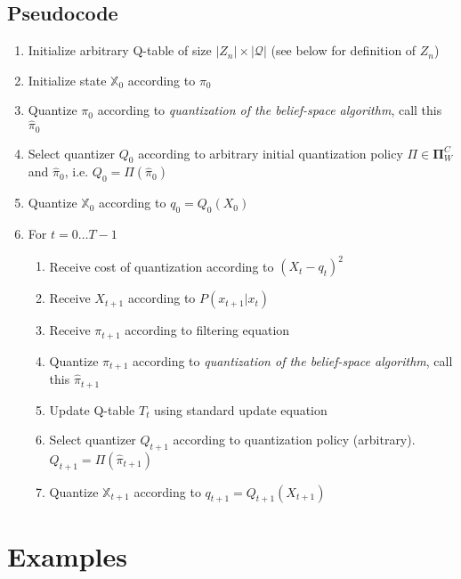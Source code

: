\documentclass{article}
\begin{document}
\subsection{Pseudocode}
\begin{enumerate}
    \item Initialize arbitrary Q-table of size \( |Z_n| \times |\mathcal{Q}| \) (see below for definition of \( Z_n \))
    \item Initialize state \( \mathbb{X}_0 \) according to \( \pi_0 \)
    \item Quantize \( \pi_0 \) according to \emph{quantization of the belief-space algorithm}, call this \( \hat{\pi}_0 \)
    \item Select quantizer \( Q_0 \) according to arbitrary initial quantization policy \( \Pi \in \mathbf{\Pi}^C_W \) and \( \hat{\pi}_0 \), i.e. \( Q_0 = \Pi(\hat{\pi}_0) \)
    \item Quantize \( \mathbb{X}_0 \) according to \( q_0 = Q_0(X_0) \)
    \item For \( t = 0 \ldots T-1 \)
          \begin{enumerate}
              \item Receive cost of quantization according to \( {(X_t - q_t)}^2 \)
              \item Receive \( X_{t+1} \) according to \( P(x_{t+1} | x_t) \)
              \item Receive \( \pi_{t+1} \) according to filtering equation
              \item Quantize \( \pi_{t+1} \) according to \emph{quantization of the belief-space algorithm}, call this \( \hat{\pi}_{t+1} \)
              \item Update Q-table \( T_t \) using standard update equation
              \item Select quantizer \( Q_{t+1} \) according to quantization policy (arbitrary). \( Q_{t+1} = \Pi(\hat{\pi}_{t+1}) \)
              \item Quantize \( \mathbb{X}_{t+1} \) according to \( q_{t+1} = Q_{t+1}(X_{t+1}) \)
          \end{enumerate}
\end{enumerate}

\section{Examples}
\end{document}
